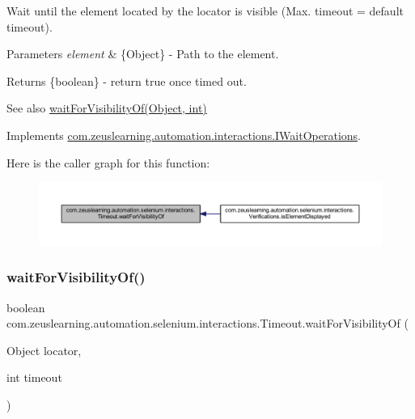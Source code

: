Wait until the element located by the locator is visible (Max. timeout = default timeout).


\begin{DoxyParams}{Parameters}
{\em element} & \{Object\} -\/ Path to the element. \\
\hline
\end{DoxyParams}
\begin{DoxyReturn}{Returns}
\{boolean\} -\/ return {\ttfamily true} once timed out.
\end{DoxyReturn}
\begin{DoxySeeAlso}{See also}
\hyperlink{classcom_1_1zeuslearning_1_1automation_1_1selenium_1_1interactions_1_1Timeout_ac615a524a7d7d0e00de7deabae2b6d9c}{wait\+For\+Visibility\+Of(\+Object, int)} 
\end{DoxySeeAlso}


Implements \hyperlink{interfacecom_1_1zeuslearning_1_1automation_1_1interactions_1_1IWaitOperations_ad52fa72b8387c5172714bdec02b754a9}{com.\+zeuslearning.\+automation.\+interactions.\+I\+Wait\+Operations}.

Here is the caller graph for this function\+:
\nopagebreak
\begin{figure}[H]
\begin{center}
\leavevmode
\includegraphics[width=350pt]{d9/df4/classcom_1_1zeuslearning_1_1automation_1_1selenium_1_1interactions_1_1Timeout_a327e77cb8ede06a2f7eef9d765812b7a_icgraph}
\end{center}
\end{figure}
\hypertarget{classcom_1_1zeuslearning_1_1automation_1_1selenium_1_1interactions_1_1Timeout_ac615a524a7d7d0e00de7deabae2b6d9c}{}\label{classcom_1_1zeuslearning_1_1automation_1_1selenium_1_1interactions_1_1Timeout_ac615a524a7d7d0e00de7deabae2b6d9c} 
\subsubsection{\texorpdfstring{wait\+For\+Visibility\+Of()}{waitForVisibilityOf()}\hspace{0.1cm}{\footnotesize\ttfamily [2/2]}}
{\footnotesize\ttfamily boolean com.\+zeuslearning.\+automation.\+selenium.\+interactions.\+Timeout.\+wait\+For\+Visibility\+Of (\begin{DoxyParamCaption}\item[{Object}]{locator,  }\item[{int}]{timeout }\end{DoxyParamCaption})\hspace{0.3cm}{\ttfamily [inline]}}

